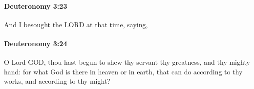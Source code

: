 		\paragraph{Deuteronomy 3:23} %
			\label{DEUTERONOMY-3-23}

			And I besought the LORD at that time, saying,


		\paragraph{Deuteronomy 3:24} %
			\label{DEUTERONOMY-3-24}

			O Lord GOD, thou hast begun to shew thy servant thy greatness, and thy mighty hand: for what God is there in heaven or in earth, that can do according to thy works, and according to thy might?


